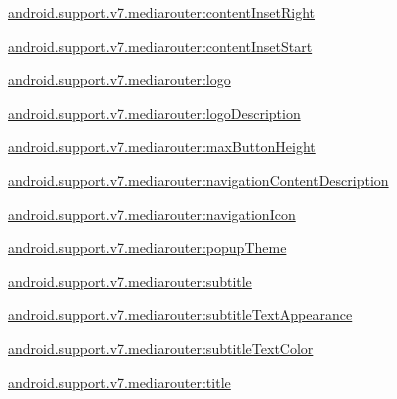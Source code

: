 {\ttfamily \hyperlink{classandroid_1_1support_1_1v7_1_1mediarouter_1_1R_1_1styleable_ad92866111ec3cf5e0b183e9fba9b637e}{android.\+support.\+v7.\+mediarouter\+:content\+Inset\+Right}}

{\ttfamily \hyperlink{classandroid_1_1support_1_1v7_1_1mediarouter_1_1R_1_1styleable_a46fac76c3774e9ae389554b7c4485493}{android.\+support.\+v7.\+mediarouter\+:content\+Inset\+Start}}

{\ttfamily \hyperlink{classandroid_1_1support_1_1v7_1_1mediarouter_1_1R_1_1styleable_ab965f1cf2cb8e80419699e46c728bc5e}{android.\+support.\+v7.\+mediarouter\+:logo}}

{\ttfamily \hyperlink{classandroid_1_1support_1_1v7_1_1mediarouter_1_1R_1_1styleable_aa07c1902f3672989051d9bdae17e9fae}{android.\+support.\+v7.\+mediarouter\+:logo\+Description}}

{\ttfamily \hyperlink{classandroid_1_1support_1_1v7_1_1mediarouter_1_1R_1_1styleable_a4ca61dab98fe3ca8b16448d7177099ae}{android.\+support.\+v7.\+mediarouter\+:max\+Button\+Height}}

{\ttfamily \hyperlink{classandroid_1_1support_1_1v7_1_1mediarouter_1_1R_1_1styleable_afe01241b2d5b5f87f898aa12e71cfa1c}{android.\+support.\+v7.\+mediarouter\+:navigation\+Content\+Description}}

{\ttfamily \hyperlink{classandroid_1_1support_1_1v7_1_1mediarouter_1_1R_1_1styleable_a19bd33bd2c0ed2e7c65711493473a5f9}{android.\+support.\+v7.\+mediarouter\+:navigation\+Icon}}

{\ttfamily \hyperlink{classandroid_1_1support_1_1v7_1_1mediarouter_1_1R_1_1styleable_a48b8c2cdd2d740aa2c3750514fedfb2a}{android.\+support.\+v7.\+mediarouter\+:popup\+Theme}}

{\ttfamily \hyperlink{classandroid_1_1support_1_1v7_1_1mediarouter_1_1R_1_1styleable_a2d7c64e1a6cb4a3235e4193b4b60aab0}{android.\+support.\+v7.\+mediarouter\+:subtitle}}

{\ttfamily \hyperlink{classandroid_1_1support_1_1v7_1_1mediarouter_1_1R_1_1styleable_ae7bd2ce11528308b118b298fe49859a8}{android.\+support.\+v7.\+mediarouter\+:subtitle\+Text\+Appearance}}

{\ttfamily \hyperlink{classandroid_1_1support_1_1v7_1_1mediarouter_1_1R_1_1styleable_a22de0afbca4455a806f9f117c354cd60}{android.\+support.\+v7.\+mediarouter\+:subtitle\+Text\+Color}}

{\ttfamily \hyperlink{classandroid_1_1support_1_1v7_1_1mediarouter_1_1R_1_1styleable_a05ec1e28754fbfa9f733ca3620654664}{android.\+support.\+v7.\+mediarouter\+:title}}

